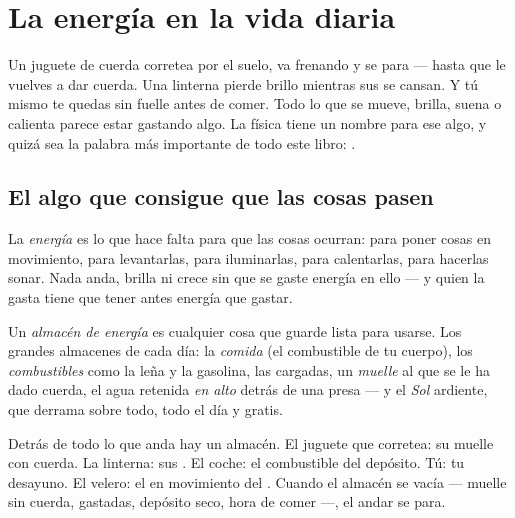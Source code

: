 \chapter{La energía en la vida diaria}\label{ch:g5:everyday-energy}

Un juguete de cuerda corretea por el suelo, va frenando y se para ---
hasta que le vuelves a dar cuerda. Una linterna pierde brillo mientras
sus  se cansan. Y tú mismo te quedas sin fuelle antes de comer.
Todo lo que se mueve, brilla, suena o calienta parece estar gastando
algo. La física tiene un nombre para ese algo, y quizá sea la palabra
más importante de todo este libro: .

\section{El algo que consigue que las cosas pasen}

\begin{definition}[La energía]\label{def:g5:everyday-energy:energy}
La \emph{energía} es lo que hace falta para que las
cosas ocurran: para poner cosas en movimiento, para levantarlas, para
iluminarlas, para calentarlas, para hacerlas sonar. Nada anda,
brilla ni crece sin que se gaste energía en ello --- y quien la gasta
tiene que tener antes energía que gastar.
\end{definition}

\begin{definition}\label{def:g5:everyday-energy:store}
Un \emph{almacén de energía} es cualquier
cosa que guarde  lista para usarse. Los grandes almacenes de
cada día: la \emph{comida} (el combustible de tu cuerpo), los
\emph{combustibles} como la leña y la gasolina, las \emph{}
cargadas, un \emph{muelle} al que se le ha dado cuerda, el agua
retenida \emph{en alto} detrás de una presa --- y el \emph{Sol}
ardiente, que derrama  sobre todo, todo el día y gratis.
\end{definition}

\begin{example}\label{ex:g5:everyday-energy:spot}
Detrás de todo lo que anda hay un almacén. El juguete que corretea: su
muelle con cuerda. La linterna: sus . El coche: el combustible
del depósito. Tú: tu desayuno. El velero: el  en movimiento del
. Cuando el almacén se vacía --- muelle sin cuerda, 
gastadas, depósito seco, hora de comer ---, el andar se para.
\end{example}

